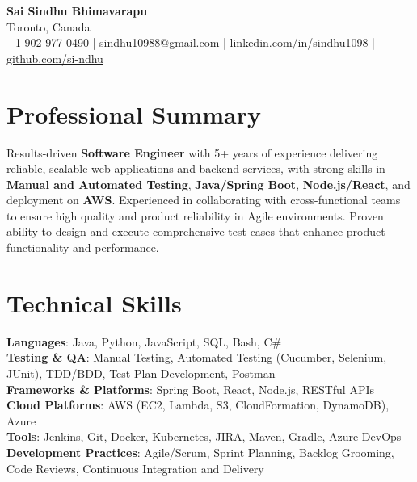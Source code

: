 \documentclass[letterpaper,11pt]{article}
\begin{document}
\begin{center}
  {\Large \textbf{Sai Sindhu Bhimavarapu}} \\
  Toronto, Canada \\
  +1-902-977-0490 \enspace | \enspace sindhu10988@gmail.com \enspace | \enspace \href{https://www.linkedin.com/in/sindhu1098/}{linkedin.com/in/sindhu1098} \enspace | \enspace \href{https://github.com/si-ndhu}{github.com/si-ndhu}
\end{center}

\section{Professional Summary}
  \begin{itemize}[leftmargin=0.15in, label={}]
    \small{\item{
     Results-driven \textbf{Software Engineer} with 5+ years of experience delivering reliable, scalable web applications and backend services, with strong skills in \textbf{Manual and Automated Testing}, \textbf{Java/Spring Boot}, \textbf{Node.js/React}, and deployment on \textbf{AWS}. Experienced in collaborating with cross-functional teams to ensure high quality and product reliability in Agile environments. Proven ability to design and execute comprehensive test cases that enhance product functionality and performance.
    }}
  \end{itemize}
\vspace{-16pt}

\section{Technical Skills}
 \begin{itemize}[leftmargin=0.15in, label={}]
    \small{\item{
     \textbf{Languages}: Java, Python, JavaScript, SQL, Bash, C\# \\
     \textbf{Testing \& QA}: Manual Testing, Automated Testing (Cucumber, Selenium, JUnit), TDD/BDD, Test Plan Development, Postman \\
     \textbf{Frameworks \& Platforms}: Spring Boot, React, Node.js, RESTful APIs \\
     \textbf{Cloud Platforms}: AWS (EC2, Lambda, S3, CloudFormation, DynamoDB), Azure \\
     \textbf{Tools}: Jenkins, Git, Docker, Kubernetes, JIRA, Maven, Gradle, Azure DevOps \\
     \textbf{Development Practices}: Agile/Scrum, Sprint Planning, Backlog Grooming, Code Reviews, Continuous Integration and Delivery  
    }}
 \end{itemize}
\vspace{-16pt}
\end{document}
